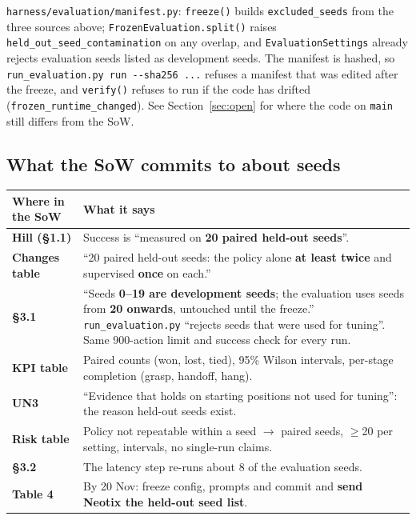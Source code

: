 \documentclass[11pt,a4paper]{article}
\newcommand{\tool}[1]{\texttt{\small #1}}
\begin{document}
\begin{incode}
\tool{harness/evaluation/manifest.py}: \tool{freeze()} builds \tool{excluded\_seeds} from the three sources above;
\tool{FrozenEvaluation.split()} raises \tool{held\_out\_seed\_contamination} on any overlap, and
\tool{EvaluationSettings} already rejects evaluation seeds listed as development seeds. The manifest is hashed, so
\tool{run\_evaluation.py run -{}-sha256 ...} refuses a manifest that was edited after the freeze, and \tool{verify()}
refuses to run if the code has drifted (\tool{frozen\_runtime\_changed}). See Section~\ref{sec:open} for where the
code on \texttt{main} still differs from the SoW.
\end{incode}

\subsection{What the SoW commits to about seeds}

\begin{center}\small
\begin{tabularx}{\linewidth}{@{}>{\bfseries}l X@{}}
\toprule
Where in the SoW & What it says\\
\midrule
Hill (\S1.1) & Success is ``measured on \textbf{20 paired held-out seeds}''.\\
Changes table & ``20 paired held-out seeds: the policy alone \textbf{at least twice} and supervised \textbf{once} on each.''\\
\S3.1 & ``Seeds \textbf{0--19 are development seeds}; the evaluation uses seeds from \textbf{20 onwards}, untouched until the freeze.'' \tool{run\_evaluation.py} ``rejects seeds that were used for tuning''. Same 900-action limit and success check for every run.\\
KPI table & Paired counts (won, lost, tied), 95\% Wilson intervals, per-stage completion (grasp, handoff, hang).\\
UN3 & ``Evidence that holds on starting positions not used for tuning'': the reason held-out seeds exist.\\
Risk table & Policy not repeatable within a seed $\to$ paired seeds, $\ge$20 per setting, intervals, no single-run claims.\\
\S3.2 & The latency step re-runs about 8 of the evaluation seeds.\\
Table 4 & By 20 Nov: freeze config, prompts and commit and \textbf{send Neotix the held-out seed list}.\\
\bottomrule
\end{tabularx}
\end{center}
\end{document}
